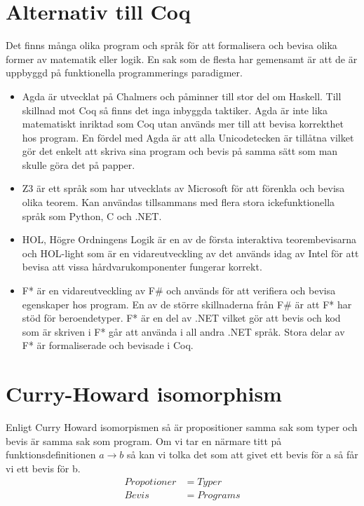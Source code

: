\section{Alternativ till Coq}
Det finns många olika program och språk för att formalisera och bevisa olika
former av matematik eller logik. En sak som de flesta har gemensamt är att de
är uppbyggd på funktionella programmerings paradigmer.

\begin{itemize}
\item Agda är utvecklat på Chalmers och påminner till stor del om Haskell. Till
skillnad mot Coq så finns det inga inbyggda taktiker.  Agda är inte lika
matematiskt inriktad som Coq utan används mer till att bevisa korrekthet hos
program. En fördel med Agda är att alla Unicodetecken är tillåtna vilket gör
det enkelt att skriva sina program och bevis på samma sätt som man skulle göra
det på papper.

\item Z3 är ett språk som har utvecklats av Microsoft för att förenkla och bevisa
olika teorem. Kan användas tillsammans med flera stora ickefunktionella språk
som Python, C och .NET.

\item HOL, Högre Ordningens Logik är en av de första interaktiva teorembevisarna och
HOL-light som är en vidareutveckling av det används idag av Intel för att
bevisa att vissa hårdvarukomponenter fungerar korrekt.

\item F* är en vidareutveckling av F\# och används för att verifiera och bevisa
egenskaper hos program. En av de större skillnaderna från F\# är att F* har
stöd för beroendetyper. F* är en del av .NET vilket gör att bevis och kod som
är skriven i F* går att använda i all andra .NET språk. Stora delar av F* är
formaliserade och bevisade i Coq.
\end{itemize}

\begin{comment}
Källor och annat material
HOL http://www.cl.cam.ac.uk/~jrh13/hol-light/
Z3 http://research.microsoft.com/en-us/um/redmond/projects/z3/old/
F* http://research.microsoft.com/en-us/projects/fstar/
\end{comment}

\section{Curry-Howard isomorphism}
Enligt Curry Howard isomorpismen så är propositioner samma sak som typer och
bevis är samma sak som program. Om vi tar en närmare titt på
funktionsdefinitionen $a \rightarrow b$ så kan vi tolka det som att givet ett
bevis för a så får vi ett bevis för b.
\begin{align*}
  Propotioner &= Typer \\
  Bevis       &= Programs
\end{align*}

